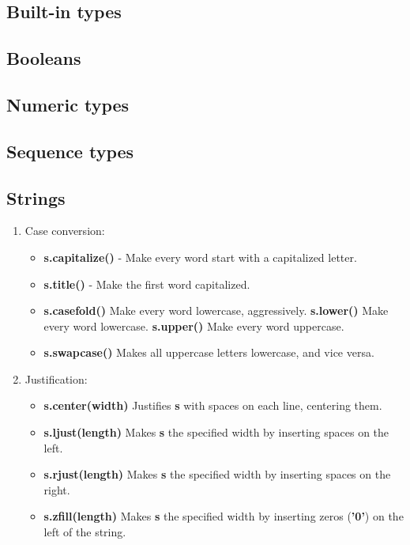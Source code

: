 \documentclass[a4paper, twoside, 8pt]{extarticle}
\newenvironment{enumx} {
	\begin{enumerate}[leftmargin=*]
	\setlength{\topsep}{0pt}
	\setlength{\itemsep}{0pt}
	\setlength{\parskip}{0pt}
	\setlength{\parsep}{0pt}
	}
{\end{enumerate}}
\newenvironment{itemx} {
	\begin{itemize}[leftmargin=*,noitemsep,topsep=0pt]
	}
{\end{itemize}}
\newcommand{\python}[1] {\textbf{\color{blue}#1}}
\begin{document}
\renewcommand{\footrulewidth}{0.4pt}


\begin{multicols*}{3}
\raggedright
\section{Built-in types}

\subsection{Booleans}

\subsection{Numeric types}


\subsection{Sequence types}

\subsection{Strings}
\begin{enumx}
\item Case conversion: 
\begin{itemx}
    \item \python{s.capitalize()} - Make every word start with a capitalized letter.
    \item \python{s.title()} - Make the first word capitalized.
    \item \python{s.casefold()} Make every word lowercase, aggressively.
          \python{s.lower()} Make every word lowercase.
          \python{s.upper()} Make every word uppercase.
      \item \python{s.swapcase()} Makes all uppercase letters lowercase, and vice versa.
\end{itemx}

\item Justification: 
\begin{itemx}
    \item \python{s.center(width)} Justifies \python{s} with spaces on each line, centering them.
    \item \python{s.ljust(length)} Makes \python{s} the specified width by inserting spaces on the left.
    \item \python{s.rjust(length)} Makes \python{s} the specified width by inserting spaces on the right.
    \item \python{s.zfill(length)} Makes \python{s} the specified width by inserting zeros (\python{'0'}) on the left of the string.


\end{itemx}
\end{enumx}
\end{multicols*}
\end{document}
